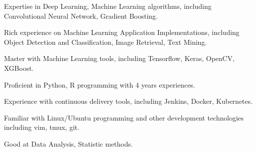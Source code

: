 

\begin{cvparagraph}
    
\end{cvparagraph}
\begin{cvparagraph}
    
\end{cvparagraph}

\begin{cvparagraph}
  \begin{cvitems}

    \item {Expertise in Deep Learning, Machine Learning algorithms, including Convolutional Neural Network, Gradient Boosting.}
    \item {Rich experience on Machine Learning Application Implementations, including Object Detection and Classification, Image Retrieval, Text Mining.}
    \item {Master with Machine Learning tools, including Tensorflow, Keras, OpenCV, XGBoost.}
    \item {Proficient in Python, R programming with 4 years experiences.}
    \item {Experience with continuous delivery tools, including Jenkins, Docker, Kubernetes.}
    \item {Familiar with Linux/Ubuntu programming and other development technologies including vim, tmux, git.}
    \item {Good at Data Analysis, Statistic methods.}
  \end{cvitems}
\end{cvparagraph}
